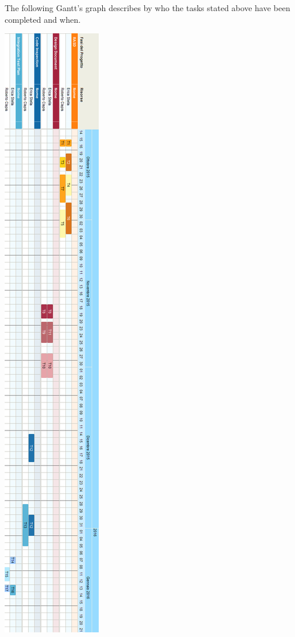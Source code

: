 \documentclass{article}
\begin{document}
The following Gantt's graph describes by who the tasks stated above have been completed and when.\\
\begin{center}
\includegraphics[height = 1.0\textheight]{PROJECTPLAN}
\end{center}
\end{document}
